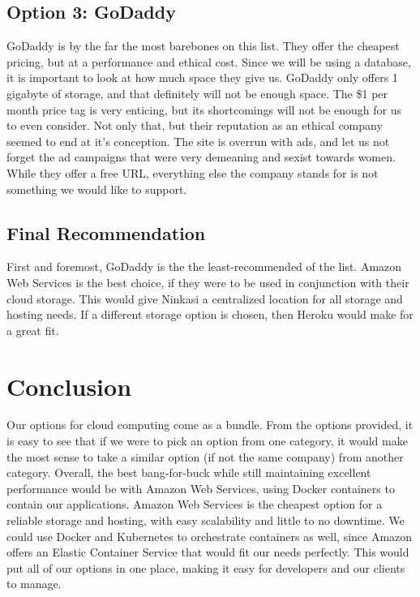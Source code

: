     \subsection{Option 3: GoDaddy}
        GoDaddy is by the far the most barebones on this list. They offer the cheapest pricing, but at a performance and ethical cost. Since we will be using a database, it is important to look at how much space they give us. GoDaddy only offers 1 gigabyte of storage, and that definitely will not be enough space. The \$1 per month price tag is very enticing, but its shortcomings will not be enough for us to even consider. Not only that, but their reputation as an ethical company seemed to end at it's conception. The site is overrun with ads, and let us not forget the ad campaigns that were very demeaning and sexist towards women. While they offer a free URL, \cite{godaddy} everything else the company stands for is not something we would like to support.
        
        \subsection{Final Recommendation} 
            First and foremost, GoDaddy is the the least-recommended of the list. Amazon Web Services is the best choice, if they were to be used in conjunction with their cloud storage. This would give Ninkasi a centralized location for all storage and hosting needs. If a different storage option is chosen, then Heroku would make for a great fit. 
        
        \section{Conclusion}
            Our options for cloud computing come as a bundle. From the options provided, it is easy to see that if we were to pick an option from one category, it would make the most sense to take a similar option (if not the same company) from another category. Overall, the best bang-for-buck while still maintaining excellent performance would be with Amazon Web Services, using Docker containers to contain our applications. Amazon Web Services is the cheapest option for a reliable storage and hosting, with easy scalability and little to no downtime. We could use Docker and Kubernetes to orchestrate containers as well, since Amazon offers an Elastic Container Service that would fit our needs perfectly. \cite{elastickub} This would put all of our options in one place, making it easy for developers and our clients to manage.
        



